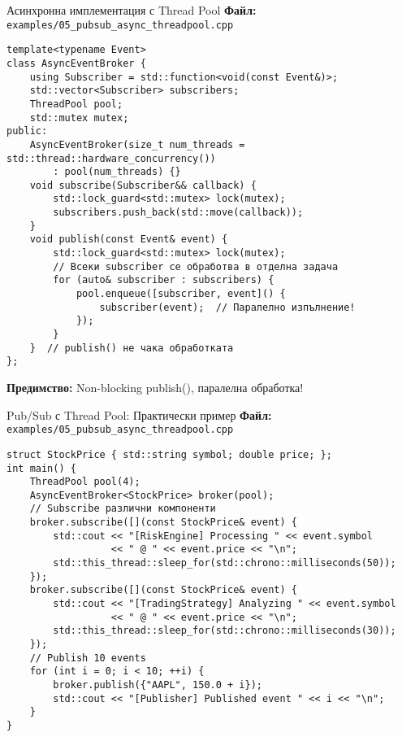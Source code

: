 \documentclass[aspectratio=169]{beamer}
\begin{document}
\begin{frame}[fragile]{Асинхронна имплементация с Thread Pool}
\textbf{Файл:} \texttt{examples/05\_pubsub\_async\_threadpool.cpp}
\begin{lstlisting}[basicstyle=\ttfamily\tiny]
template<typename Event>
class AsyncEventBroker {
    using Subscriber = std::function<void(const Event&)>;
    std::vector<Subscriber> subscribers;
    ThreadPool pool;
    std::mutex mutex;
public:
    AsyncEventBroker(size_t num_threads = std::thread::hardware_concurrency())
        : pool(num_threads) {}
    void subscribe(Subscriber&& callback) {
        std::lock_guard<std::mutex> lock(mutex);
        subscribers.push_back(std::move(callback));
    }
    void publish(const Event& event) {
        std::lock_guard<std::mutex> lock(mutex);
        // Всеки subscriber се обработва в отделна задача
        for (auto& subscriber : subscribers) {
            pool.enqueue([subscriber, event]() {
                subscriber(event);  // Паралелно изпълнение!
            });
        }
    }  // publish() не чака обработката
};
\end{lstlisting}

\textbf{Предимство:} Non-blocking publish(), паралелна обработка!
\end{frame}

\begin{frame}[fragile]{Pub/Sub с Thread Pool: Практически пример}
\textbf{Файл:} \texttt{examples/05\_pubsub\_async\_threadpool.cpp}
\begin{lstlisting}[basicstyle=\ttfamily\tiny]
struct StockPrice { std::string symbol; double price; };
int main() {
    ThreadPool pool(4);
    AsyncEventBroker<StockPrice> broker(pool);
    // Subscribe различни компоненти
    broker.subscribe([](const StockPrice& event) {
        std::cout << "[RiskEngine] Processing " << event.symbol 
                  << " @ " << event.price << "\n";
        std::this_thread::sleep_for(std::chrono::milliseconds(50));
    });
    broker.subscribe([](const StockPrice& event) {
        std::cout << "[TradingStrategy] Analyzing " << event.symbol 
                  << " @ " << event.price << "\n";
        std::this_thread::sleep_for(std::chrono::milliseconds(30));
    });
    // Publish 10 events
    for (int i = 0; i < 10; ++i) {
        broker.publish({"AAPL", 150.0 + i});
        std::cout << "[Publisher] Published event " << i << "\n";
    }
}
\end{lstlisting}
\end{frame}
\end{document}
